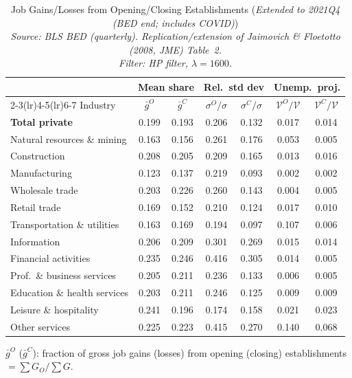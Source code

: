 \begin{table}[htbp]
\centering
\small
\caption{Job Gains/Losses from Opening/Closing Establishments (\emph{Extended to 2021Q4 (BED end; includes COVID)}) \\
  \emph{Source: BLS BED (quarterly). Replication/extension of Jaimovich \& Floetotto (2008, JME) Table~2.} \\  \emph{Filter: HP filter, $\lambda=1600$.}}
\label{tab:jf_t2_ext_2021_hp}
\begin{tabular}{lcccccc}
\toprule
 & \multicolumn{2}{c}{Mean share} & \multicolumn{2}{c}{Rel.\ std dev} & \multicolumn{2}{c}{Unemp.\ proj.} \\
\cmidrule(lr){2-3}\cmidrule(lr){4-5}\cmidrule(lr){6-7}
Industry & $\bar{g}^O$ & $\bar{g}^C$ & $\sigma^O/\sigma$ & $\sigma^C/\sigma$ & $\mathcal{V}^O/\mathcal{V}$ & $\mathcal{V}^C/\mathcal{V}$ \\
\midrule
\midrule
\textbf{Total private} & 0.199 & 0.193 & 0.206 & 0.132 & 0.017 & 0.014 \\
Natural resources \& mining & 0.163 & 0.156 & 0.261 & 0.176 & 0.053 & 0.005 \\
Construction & 0.208 & 0.205 & 0.209 & 0.165 & 0.013 & 0.016 \\
Manufacturing & 0.123 & 0.137 & 0.219 & 0.093 & 0.002 & 0.002 \\
Wholesale trade & 0.203 & 0.226 & 0.260 & 0.143 & 0.004 & 0.005 \\
Retail trade & 0.169 & 0.152 & 0.210 & 0.124 & 0.017 & 0.010 \\
Transportation \& utilities & 0.163 & 0.169 & 0.194 & 0.097 & 0.107 & 0.006 \\
Information & 0.206 & 0.209 & 0.301 & 0.269 & 0.015 & 0.014 \\
Financial activities & 0.235 & 0.246 & 0.416 & 0.305 & 0.014 & 0.005 \\
Prof.~\& business services & 0.205 & 0.211 & 0.236 & 0.133 & 0.006 & 0.005 \\
Education \& health services & 0.203 & 0.211 & 0.246 & 0.125 & 0.009 & 0.009 \\
Leisure \& hospitality & 0.241 & 0.196 & 0.174 & 0.158 & 0.021 & 0.023 \\
Other services & 0.225 & 0.223 & 0.415 & 0.270 & 0.140 & 0.068 \\
\bottomrule
\end{tabular}
\begin{tablenotes}[flushleft]\footnotesize
\item $\bar{g}^O$ ($\bar{g}^C$): fraction of gross job gains (losses) from opening (closing) establishments $= \sum G_O / \sum G$.

\end{tablenotes}
\end{table}
